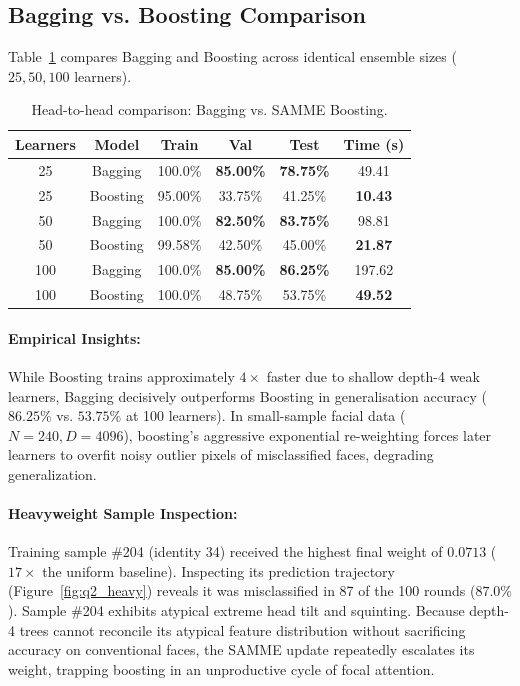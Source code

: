 \documentclass[10pt,twocolumn,letterpaper]{article}
\begin{document}
\subsection{Bagging vs. Boosting Comparison}
Table~\ref{tab:q2_comparison} compares Bagging and Boosting across identical ensemble sizes ($25, 50, 100$ learners).

\begin{table}[h]
\centering
\small
\caption{Head-to-head comparison: Bagging vs. SAMME Boosting.}
\label{tab:q2_comparison}
\begin{tabular}{cccccc}
\toprule
Learners & Model & Train & Val & Test & Time (s) \\
\midrule
25 & Bagging & 100.0\% & \textbf{85.00\%} & \textbf{78.75\%} & 49.41 \\
25 & Boosting & 95.00\% & 33.75\% & 41.25\% & \textbf{10.43} \\
\midrule
50 & Bagging & 100.0\% & \textbf{82.50\%} & \textbf{83.75\%} & 98.81 \\
50 & Boosting & 99.58\% & 42.50\% & 45.00\% & \textbf{21.87} \\
\midrule
100 & Bagging & 100.0\% & \textbf{85.00\%} & \textbf{86.25\%} & 197.62 \\
100 & Boosting & 100.0\% & 48.75\% & 53.75\% & \textbf{49.52} \\
\bottomrule
\end{tabular}
\end{table}

\paragraph{Empirical Insights:}
While Boosting trains approximately $4\times$ faster due to shallow depth-4 weak learners, Bagging decisively outperforms Boosting in generalisation accuracy ($86.25\%$ vs. $53.75\%$ at 100 learners). In small-sample facial data ($N=240, D=4096$), boosting's aggressive exponential re-weighting forces later learners to overfit noisy outlier pixels of misclassified faces, degrading generalization.

\paragraph{Heavyweight Sample Inspection:}
Training sample \#204 (identity 34) received the highest final weight of $0.0713$ ($17\times$ the uniform baseline). Inspecting its prediction trajectory (Figure~\ref{fig:q2_heavy}) reveals it was misclassified in 87 of the 100 rounds ($87.0\%$). Sample \#204 exhibits atypical extreme head tilt and squinting. Because depth-4 trees cannot reconcile its atypical feature distribution without sacrificing accuracy on conventional faces, the SAMME update repeatedly escalates its weight, trapping boosting in an unproductive cycle of focal attention.
\end{document}
